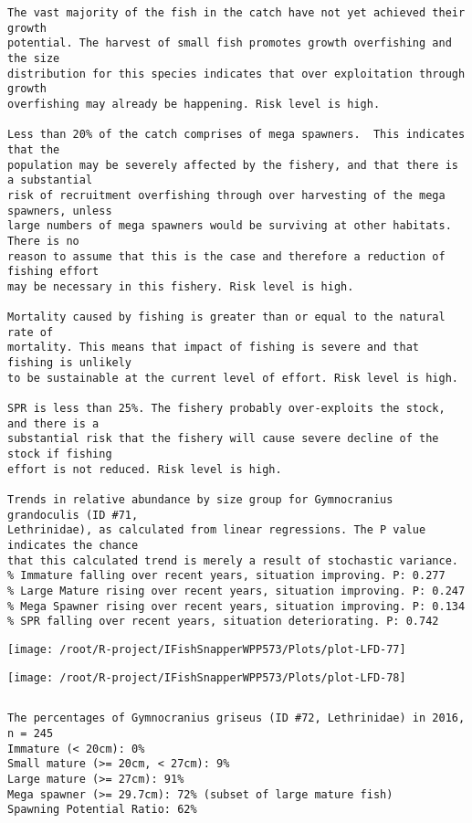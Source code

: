 \documentclass{report}\usepackage[]{graphicx}\usepackage[]{color}
\makeatletter
\def\maxwidth{ %
  \ifdim\Gin@nat@width>\linewidth
    \linewidth
  \else
    \Gin@nat@width
  \fi
}
\newenvironment{kframe}{%
 \def\at@end@of@kframe{}%
 \ifinner\ifhmode%
  \def\at@end@of@kframe{\end{minipage}}%
  \begin{minipage}{\columnwidth}%
 \fi\fi%
 \def\FrameCommand##1{\hskip\@totalleftmargin \hskip-\fboxsep
 \colorbox{shadecolor}{##1}\hskip-\fboxsep
     \hskip-\linewidth \hskip-\@totalleftmargin \hskip\columnwidth}%
 \MakeFramed {\advance\hsize-\width
   \@totalleftmargin\z@ \linewidth\hsize
   \@setminipage}}%
 {\par\unskip\endMakeFramed%
 \at@end@of@kframe}
\newenvironment{knitrout}{}{} %
\makeatother
\begin{document}
\begin{knitrout}
\begin{kframe}
\begin{verbatim}
The vast majority of the fish in the catch have not yet achieved their growth
potential. The harvest of small fish promotes growth overfishing and the size
distribution for this species indicates that over exploitation through growth
overfishing may already be happening. Risk level is high.

Less than 20% of the catch comprises of mega spawners.  This indicates that the
population may be severely affected by the fishery, and that there is a substantial
risk of recruitment overfishing through over harvesting of the mega spawners, unless
large numbers of mega spawners would be surviving at other habitats. There is no
reason to assume that this is the case and therefore a reduction of fishing effort
may be necessary in this fishery. Risk level is high.
 
Mortality caused by fishing is greater than or equal to the natural rate of
mortality. This means that impact of fishing is severe and that fishing is unlikely
to be sustainable at the current level of effort. Risk level is high.
 
SPR is less than 25%. The fishery probably over-exploits the stock, and there is a
substantial risk that the fishery will cause severe decline of the stock if fishing
effort is not reduced. Risk level is high.
 
Trends in relative abundance by size group for Gymnocranius grandoculis (ID #71,
Lethrinidae), as calculated from linear regressions. The P value indicates the chance
that this calculated trend is merely a result of stochastic variance.
% Immature falling over recent years, situation improving. P: 0.277
% Large Mature rising over recent years, situation improving. P: 0.247
% Mega Spawner rising over recent years, situation improving. P: 0.134
% SPR falling over recent years, situation deteriorating. P: 0.742
\end{verbatim}
\end{kframe}
\texttt{[image: /root/R-project/IFishSnapperWPP573/Plots/plot-LFD-77]} 

\texttt{[image: /root/R-project/IFishSnapperWPP573/Plots/plot-LFD-78]} 
\begin{kframe}\begin{verbatim}
\end{verbatim}
\end{kframe}
\clearpage
\newpage
\begin{kframe}\begin{verbatim}The percentages of Gymnocranius griseus (ID #72, Lethrinidae) in 2016, n = 245
Immature (< 20cm): 0%
Small mature (>= 20cm, < 27cm): 9%
Large mature (>= 27cm): 91%
Mega spawner (>= 29.7cm): 72% (subset of large mature fish)
Spawning Potential Ratio: 62%
 

\end{verbatim}
\end{kframe}
\end{knitrout}
\end{document}
